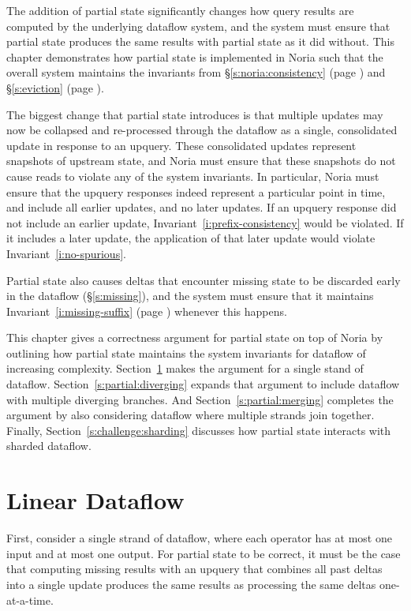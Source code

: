 The addition of partial state significantly changes how query results are
computed by the underlying dataflow system, and the system must ensure that
partial state produces the same results with partial state as it did without.
This chapter demonstrates how partial state is implemented in Noria such that
the overall system maintains the invariants from \S\ref{s:noria:consistency}
(page \pageref{i:no-spurious}) and \S\ref{s:eviction} (page
\pageref{i:missing-suffix}).

The biggest change that partial state introduces is that multiple updates may
now be collapsed and re-processed through the dataflow as a single, consolidated
update in response to an upquery. These consolidated updates represent snapshots
of upstream state, and Noria must ensure that these snapshots do not cause reads
to violate any of the system invariants. In particular, Noria must ensure that
the upquery responses indeed represent a particular point in time, and include
all earlier updates, and no later updates. If an upquery response did not
include an earlier update, Invariant~\ref{i:prefix-consistency} would be
violated. If it includes a later update, the application of that later update
would violate Invariant~\ref{i:no-spurious}.

Partial state also causes deltas that encounter missing state to be discarded
early in the dataflow (\S\ref{s:missing}), and the system must ensure that it
maintains Invariant~\ref{i:missing-suffix} (page \pageref{i:missing-suffix})
whenever this happens.

This chapter gives a correctness argument for partial state on top of Noria by
outlining how partial state maintains the system invariants for dataflow of
increasing complexity. Section~\ref{s:partial:linear} makes the argument for a
single stand of dataflow. Section~\ref{s:partial:diverging} expands that
argument to include dataflow with multiple diverging branches. And
Section~\ref{s:partial:merging} completes the argument by also considering
dataflow where multiple strands join together. Finally,
Section~\ref{s:challenge:sharding} discusses how partial state interacts with
sharded dataflow.

\section{Linear Dataflow}
\label{s:partial:linear}

First, consider a single strand of dataflow, where each operator has at most one
input and at most one output. For partial state to be correct, it must be the
case that computing missing results with an upquery that combines all past
deltas into a single update produces the same results as processing the same
deltas one-at-a-time.

